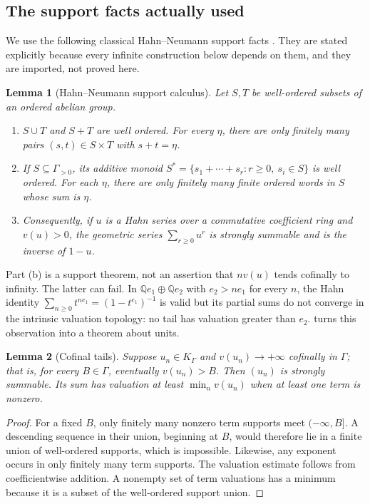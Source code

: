 \documentclass[11pt]{article}
\theoremstyle{plain}
\newtheorem{lemma}[lemma]{Lemma}
\theoremstyle{plain}
\theoremstyle{plain}
\theoremstyle{definition}
\theoremstyle{definition}
\theoremstyle{definition}
\theoremstyle{definition}
\theoremstyle{remark}
\newcommand{\Q}{\mathbb Q}\newcommand{\Z}{\mathbb Z}\newcommand{\N}{\mathbb N}
\newcommand{\K}{K_\Gamma}\newcommand{\KD}{K_\Delta}
\begin{document}
\subsection{The support facts actually used}
We use the following classical Hahn--Neumann support facts
\cite{Neumann}\cite[Section~3]{Poonen}\cite{vdH}. They are stated explicitly
because every infinite construction below depends on them, and they are
imported, not proved here.

\begin{lemma}[Hahn--Neumann support calculus]\label{ent:lem:neumann}
Let $S,T$ be well-ordered subsets of an ordered abelian group.
\begin{enumerate}[label=\textnormal{(\alph*)},leftmargin=2em]
\item $S\cup T$ and $S+T$ are well ordered. For every $\eta$, there are only
finitely many pairs $(s,t)\in S\times T$ with $s+t=\eta$.
\item If $S\subseteq\Gamma_{>0}$, its additive monoid
$S^*=\{s_1+\cdots+s_r:r\ge0,\ s_i\in S\}$ is well ordered. For each $\eta$,
there are only finitely many finite ordered words in $S$ whose sum is $\eta$.
\item Consequently, if $u$ is a Hahn series over a commutative coefficient
ring and $v(u)>0$, the geometric series $\sum_{r\ge0}u^r$ is strongly
summable and is the inverse of $1-u$.
\end{enumerate}
\end{lemma}

Part (b) is a support theorem, not an assertion that $nv(u)$ tends cofinally
to infinity. The latter can fail. In $\Q e_1\oplus\Q e_2$ with $e_2>ne_1$ for
every $n$, the Hahn identity $\sum_{n\ge0}t^{ne_1}=(1-t^{e_1})^{-1}$ is valid
but its partial sums do not converge in the intrinsic valuation topology: no
tail has valuation greater than $e_2$.  turns this
observation into a theorem about units.

\begin{lemma}[Cofinal tails]\label{ent:lem:cofinal-tails}
Suppose $u_n\in\K$ and $v(u_n)\to+\infty$ cofinally in $\Gamma$; that is, for
every $B\in\Gamma$, eventually $v(u_n)>B$. Then $(u_n)$ is strongly summable.
Its sum has valuation at least $\min_n v(u_n)$ when at least one term is
nonzero.
\end{lemma}
\begin{proof}
For a fixed $B$, only finitely many nonzero term supports meet
$(-\infty,B]$. A descending sequence in their union, beginning at $B$, would
therefore lie in a finite union of well-ordered supports, which is
impossible. Likewise, any exponent occurs in only finitely many term
supports. The valuation estimate follows from coefficientwise addition. A
nonempty set of term valuations has a minimum because it is a subset of the
well-ordered support union.
\end{proof}
\end{document}
